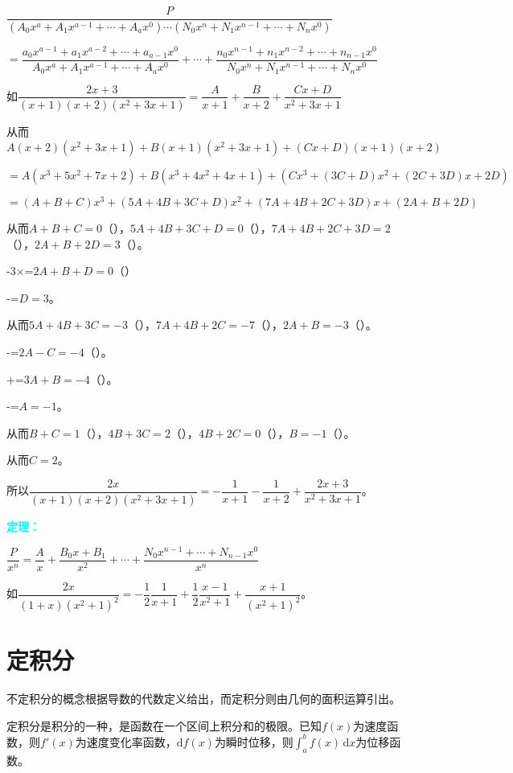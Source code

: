 \documentclass[UTF8, 12pt]{ctexart}
\begin{document}
$\dfrac{P}{(A_0x^a+A_1x^{a-1}+\cdots+A_ax^0)\cdots(N_0x^n+N_1x^{n-1}+\cdots+N_nx^0)}$ \medskip

$=\dfrac{a_0x^{a-1}+a_1x^{a-2}+\cdots+a_{a-1}x^0}{A_0x^a+A_1x^{a-1}+\cdots+A_ax^0}+\cdots+\dfrac{n_0x^{n-1}+n_1x^{n-2}+\cdots+n_{n-1}x^0}{N_0x^n+N_1x^{n-1}+\cdots+N_nx^0}$ \medskip

如$\dfrac{2x+3}{(x+1)(x+2)(x^2+3x+1)}=\dfrac{A}{x+1}+\dfrac{B}{x+2}+\dfrac{Cx+D}{x^2+3x+1}$ \medskip

从而$A(x+2)(x^2+3x+1)+B(x+1)(x^2+3x+1)+(Cx+D)(x+1)(x+2)$

$=A(x^3+5x^2+7x+2)+B(x^3+4x^2+4x+1)+(Cx^3+(3C+D)x^2+(2C+3D)x+2D)$

$=(A+B+C)x^3+(5A+4B+3C+D)x^2+(7A+4B+2C+3D)x+(2A+B+2D)$

从而$A+B+C=0$（），$5A+4B+3C+D=0$（），$7A+4B+2C+3D=2$（），$2A+B+2D=3$（）。

-3×=$2A+B+D=0$（）

-=$D=3$。

从而$5A+4B+3C=-3$（），$7A+4B+2C=-7$（），$2A+B=-3$（）。

-=$2A-C=-4$（）。

+=$3A+B=-4$（）。

-=$A=-1$。

从而$B+C=1$（），$4B+3C=2$（），$4B+2C=0$（），$B=-1$（）。

从而$C=2$。

所以$\dfrac{2x}{(x+1)(x+2)(x^2+3x+1)}=-\dfrac{1}{x+1}-\dfrac{1}{x+2}+\dfrac{2x+3}{x^2+3x+1}$。\medskip

\textcolor{aqua}{\textbf{定理：}}

$\dfrac{P}{x^n}=\dfrac{A}{x}+\dfrac{B_0x+B_1}{x^2}+\cdots+\dfrac{N_0x^{n-1}+\cdots+N_{n-1}x^0}{x^n}$ \medskip

如$\dfrac{2x}{(1+x)(x^2+1)^2}=-\dfrac{1}{2}\dfrac{1}{x+1}+\dfrac{1}{2}\dfrac{x-1}{x^2+1}+\dfrac{x+1}{(x^2+1)^2}$。

\section{定积分}

不定积分的概念根据导数的代数定义给出，而定积分则由几何的面积运算引出。

定积分是积分的一种，是函数在一个区间上积分和的极限。已知$f(x)$为速度函数，则$f'(x)$为速度变化率函数，$\textrm{d}f(x)$为瞬时位移，则$\int_{a}^bf(x)\,\textrm{d}x$为位移函数。
\end{document}
